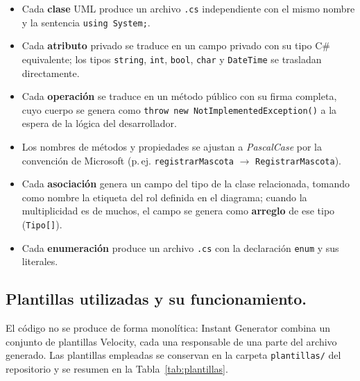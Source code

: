 \documentclass[journal,onecolumn]{IEEEtran}
\begin{document}
	\begin{itemize}[leftmargin=*, itemsep=2pt]
		\item Cada \textbf{clase} UML produce un archivo \texttt{.cs} independiente con el mismo nombre y la sentencia \texttt{using System;}.
		\item Cada \textbf{atributo} privado se traduce en un campo privado con su tipo C\# equivalente; los tipos \texttt{string}, \texttt{int}, \texttt{bool}, \texttt{char} y \texttt{DateTime} se trasladan directamente.
		\item Cada \textbf{operación} se traduce en un método público con su firma completa, cuyo cuerpo se genera como \texttt{throw new NotImplementedException()} a la espera de la lógica del desarrollador.
		\item Los nombres de métodos y propiedades se ajustan a \emph{PascalCase} por la convención de Microsoft (p.\,ej. \texttt{registrarMascota} $\to$ \texttt{RegistrarMascota}).
		\item Cada \textbf{asociación} genera un campo del tipo de la clase relacionada, tomando como nombre la etiqueta del rol definida en el diagrama; cuando la multiplicidad es de muchos, el campo se genera como \textbf{arreglo} de ese tipo (\texttt{Tipo[]}).
		\item Cada \textbf{enumeración} produce un archivo \texttt{.cs} con la declaración \texttt{enum} y sus literales.
	\end{itemize}
	
	\subsection{Plantillas utilizadas y su funcionamiento.} El código no se produce de forma monolítica: Instant Generator combina un conjunto de plantillas Velocity, cada una responsable de una parte del archivo generado. Las plantillas empleadas se conservan en la carpeta \texttt{plantillas/} del repositorio y se resumen en la Tabla~\ref{tab:plantillas}.
	
\end{document}
